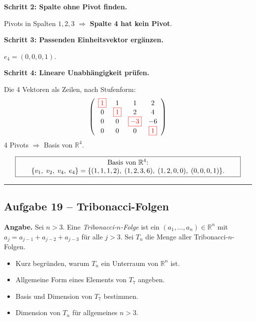 \documentclass[a4paper,12pt]{article}
\newcommand{\piv}[1]{{\color{red}\boxed{#1}}}
\begin{document}
\textbf{Schritt 2: Spalte ohne Pivot finden.}

Pivots in Spalten $1, 2, 3$ $\Rightarrow$ \textbf{Spalte 4 hat kein Pivot}.

\textbf{Schritt 3: Passenden Einheitsvektor erg\"anzen.}

$e_4 = (0,0,0,1)$.

\textbf{Schritt 4: Lineare Unabh\"angigkeit pr\"ufen.}

Die 4 Vektoren als Zeilen, nach Stufenform:
\[
\left(\begin{array}{cccc}
\piv{1} & 1 & 1 & 2 \\
0 & \piv{1} & 2 & 4 \\
0 & 0 & \piv{-3} & -6 \\
0 & 0 & 0 & \piv{1}
\end{array}\right)
\]
4 Pivots $\Rightarrow$ Basis von $\mathbb{R}^4$.

\[
\fbox{\parbox{0.93\textwidth}{\centering
Basis von $\mathbb{R}^4$: $\{v_1,\; v_2,\; v_4,\; e_4\} = \{(1,1,1,2),\; (1,2,3,6),\; (1,2,0,0),\; (0,0,0,1)\}.$
}}
\]

\bigskip
\hrule
\bigskip

\subsection*{Aufgabe 19 -- Tribonacci-Folgen}

\textbf{Angabe.} Sei $n > 3$. Eine \textit{Tribonacci-$n$-Folge} ist ein $(a_1, \dots, a_n) \in \mathbb{R}^n$ mit $a_j = a_{j-1} + a_{j-2} + a_{j-3}$ f\"ur alle $j > 3$. Sei $T_n$ die Menge aller Tribonacci-$n$-Folgen.
\begin{itemize}[nosep]
\item[(a)] Kurz begr\"unden, warum $T_n$ ein Unterraum von $\mathbb{R}^n$ ist.
\item[(b)] Allgemeine Form eines Elements von $T_7$ angeben.
\item[(c)] Basis und Dimension von $T_7$ bestimmen.
\item[(d)] Dimension von $T_n$ f\"ur allgemeines $n > 3$.
\end{itemize}
\end{document}
